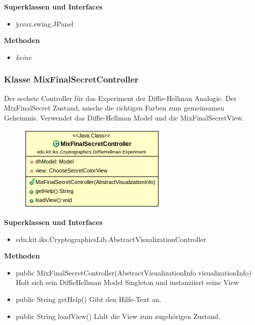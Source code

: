 \documentclass{article}
\begin{document}
      \textbf{Superklassen und Interfaces}
      \begin{itemize}
        \item javax.swing.JPanel
      \end{itemize}

      \textbf{Methoden}
      \begin{itemize}
        \item \textit{keine}
      \end{itemize}

\subsubsection{Klasse MixFinalSecretController}
      Der sechste Controller für das Experiment der Diffie-Hellman Analogie.
      Der MixFinalSecret Zustand, mische die richtigen Farben
      zum gemeinsamen Geheimnis.
      Verwendet das Diffie-Hellman Model und die MixFinalSecretView.

      \begin{figure}[H]
        \centering
        \includegraphics{resources/edu-kit-iks-Cryptographics-DiffieHellman-Experiment-MixFinalSecretController}
      \end{figure}

      \textbf{Superklassen und Interfaces}
      \begin{itemize}
        \item edu.kit.iks.CryptographicsLib.AbstractVisualizationController
      \end{itemize}

      \textbf{Methoden}
      \begin{itemize}
          \item public MixFinalSecretController(AbstractVisualizationInfo visualizationInfo) \newline
              Holt sich sein DiffieHellman Model Singleton und instanziiert seine View
        \item public String getHelp() \newline
        Gibt den Hilfe-Text an.
        \item public String loadView() \newline
        Lädt die View zum zugehörigen Zustand.
      \end{itemize}
\end{document}
